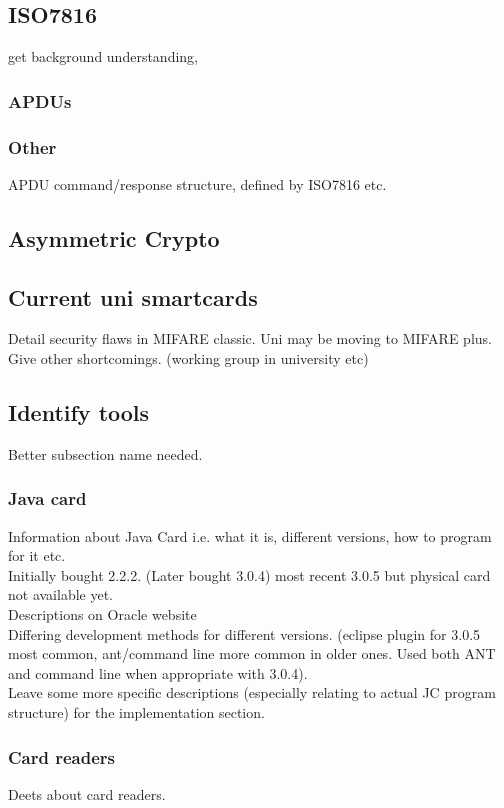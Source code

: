 \documentclass[12pt]{article}
\begin{document}
\subsection{ISO7816}
get background understanding,
\subsubsection{APDUs}
\subsubsection{Other}
APDU command/response structure, defined by ISO7816 etc. 
\subsection{Asymmetric Crypto}
\subsection{Current uni smartcards}
Detail security flaws in MIFARE classic. Uni may be moving to MIFARE plus.\\
Give other shortcomings. (working group in university etc)
\subsection{Identify tools}
Better subsection name needed.
\subsubsection{Java card}
Information about Java Card i.e. what it is, different versions, how to program for it etc.\\
Initially bought 2.2.2. (Later bought 3.0.4) most recent 3.0.5 but physical card not available yet.\\
Descriptions on Oracle website\\
Differing development methods for different versions. (eclipse plugin for 3.0.5 most common, ant/command line more common in older ones. Used both ANT and command line when appropriate with 3.0.4).\\

Leave some more specific descriptions (especially relating to actual JC program structure) for the implementation section.
\subsubsection{Card readers}
Deets about card readers.\\
\end{document}

